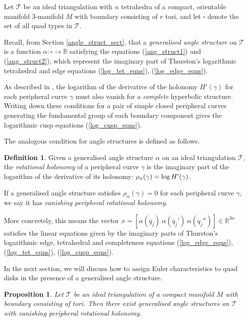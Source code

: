 \documentclass[12pt,reqno]{amsart}  %
\newtheorem{prop}[thm]{Proposition}
\theoremstyle{definition}
\newtheorem{defn}[thm]{Definition}
\theoremstyle{remark}
\def\R{\mathbb{R}}
\newcommand{\T}{\mathcal{T}}
\newcommand{\sect}{\textsection}
\let\Im\relax
\DeclareMathOperator{\Im}{Im}
\def\quads{\square}  %
\begin{document}
Let $\T$ be an ideal triangulation with $n$ tetrahedra of a compact, 
orientable manifold 3-manifold $M$ with boundary consisting of $r$ tori, 
and let $\quads$ denote the set of all quad types in $\T$.

Recall, from Section \ref{angle_struct_sect}, that a 
{\em generalised angle structure} on $\T$ is a function 
$\alpha: \quads \to \R$ satisfying the equations (\ref{ang_struct1}) and 
(\ref{ang_struct2}), which represent the imaginary part of Thurston's 
logarithmic tetrahedral and edge equations (\ref{log_tet_eqns}), 
(\ref{log_edge_eqns}).

As described in \cite[\sect 4.3.2]{Th}, the logarithm of the derivative 
of the holonomy $H'(\gamma)$ for each peripheral curve $\gamma$ must also 
vanish for a {\em complete} hyperbolic structure. Writing down these 
conditions for a pair of simple closed peripheral curves generating 
the fundamental group of each boundary component gives the logarithmic 
cusp equations (\ref{log_cusp_eqns}).

The analogous condition for  angle structures is defined as follows.

\begin{defn}  
Given a generalised angle structure $\alpha$ on an ideal triangulation $\T$,
the {\em rotational holonomy} of a peripheral curve $\gamma$ is the 
imaginary part of the logarithm of the derivative of its holonomy:
$\rho_\alpha(\gamma) = \Im \log H'(\gamma)$.

If a generalised angle structure satisfies $\rho_\alpha(\gamma)=0$ for 
each peripheral curve $\gamma$, we say it has 
\emph{vanishing peripheral rotational holonomy}. 
\end{defn}

More concretely,  this means the vector 
$x =[ \alpha(q_j) ~ \alpha(q_j')~ \alpha(q_j'') ] \in \R^{3n}$ 
satisfies the linear equations given by the imaginary parts  of Thurston's 
logarithmic edge, tetrahedral and completeness equations 
(\ref{log_edge_eqns}),  (\ref{log_tet_eqns}), (\ref{log_cusp_eqns}).

In the next section, we will discuss how to assign Euler characteristics 
to quad disks in the presence of a generalised angle structure. 

\begin{prop}
\label{gen_ang_zero_periph_rot_hol}
Let $\T$ be an ideal triangulation of a compact manifold $M$ with boundary 
consisting of tori. Then there exist generalised angle structures on $\T$ with 
vanishing peripheral rotational holonomy.
\end{prop}
\end{document}
